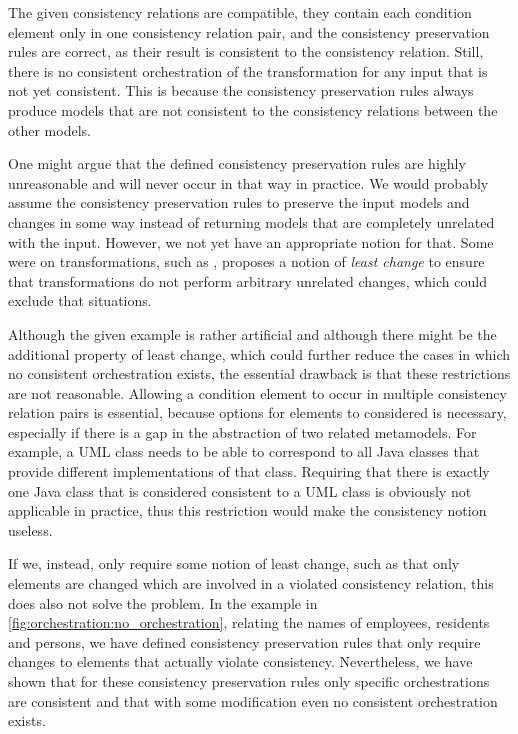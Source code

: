 The given consistency relations are compatible, they contain each condition element only in one consistency relation pair, and the consistency preservation rules are correct, as their result is consistent to the consistency relation.
Still, there is no consistent orchestration of the transformation for any input that is not yet consistent.
This is because the consistency preservation rules always produce models that are not consistent to the consistency relations between the other models.

One might argue that the defined consistency preservation rules are highly unreasonable and will never occur in that way in practice.
We would probably assume the consistency preservation rules to preserve the input models and changes in some way instead of returning models that are completely unrelated with the input.
However, we not yet have an appropriate notion for that.
Some were on transformations, such as \cite{cheney2017LeastChangeBx-JOT,macedo2016alloy}, proposes a notion of \emph{least change} to ensure that transformations do not perform arbitrary unrelated changes, which could exclude that situations.

Although the given example is rather artificial and although there might be the additional property of least change, which could further reduce the cases in which no consistent orchestration exists, the essential drawback is that these restrictions are not reasonable.
Allowing a condition element to occur in multiple consistency relation pairs is essential, because options for elements to considered is necessary, especially if there is a gap in the abstraction of two related metamodels.
For example, a UML class needs to be able to correspond to all Java classes that provide different implementations of that class.
Requiring that there is exactly one Java class that is considered consistent to a UML class is obviously not applicable in practice, thus this restriction would make the consistency notion useless.

If we, instead, only require some notion of least change, such as that only elements are changed which are involved in a violated consistency relation, this does also not solve the problem.
In the example in \autoref{fig:orchestration:no_orchestration}, relating the names of employees, residents and persons, we have defined consistency preservation rules that only require changes to elements that actually violate consistency.
Nevertheless, we have shown that for these consistency preservation rules only specific orchestrations are consistent and that with some modification even no consistent orchestration exists.

